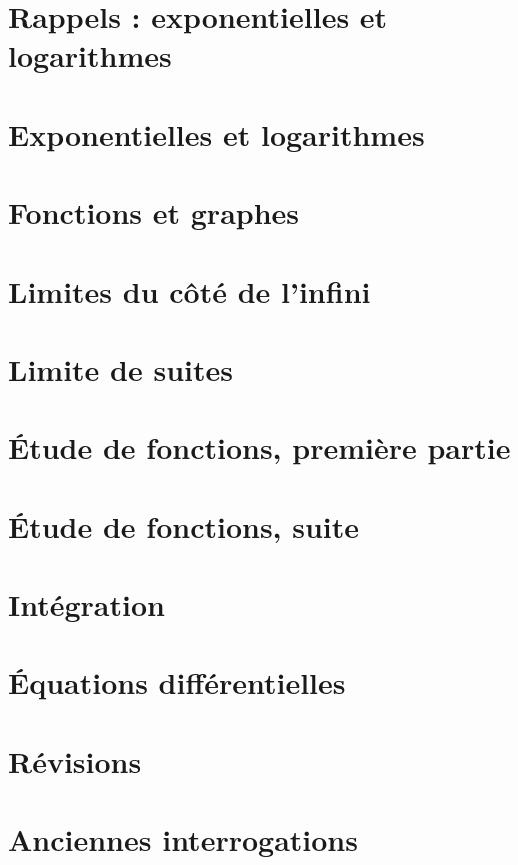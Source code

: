 \section{Rappels : exponentielles et logarithmes}



\section{Exponentielles et logarithmes}



\section{Fonctions et graphes}



\section{Limites du côté de l'infini}


\section{Limite de suites}



\section{Étude de fonctions, première partie}


\section{Étude de fonctions, suite}


\section{Intégration}



\section{Équations différentielles}


\section{Révisions}


\section{Anciennes interrogations}

